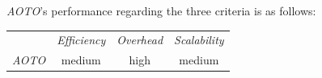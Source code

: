 %
\emph{AOTO}'s performance regarding the three criteria is as follows:
\begin{center}
{\footnotesize
\begin{tabular}{rccc}
\multicolumn{1}{r}{} &
\multicolumn{1}{c}{\emph{Efficiency}} &
\multicolumn{1}{c}{\emph{Overhead}} &
\multicolumn{1}{c}{\emph{Scalability}}
\\
\cline{2-4}
\emph{AOTO} &
%
medium &
high &
medium
\end{tabular}
}
\end{center}

